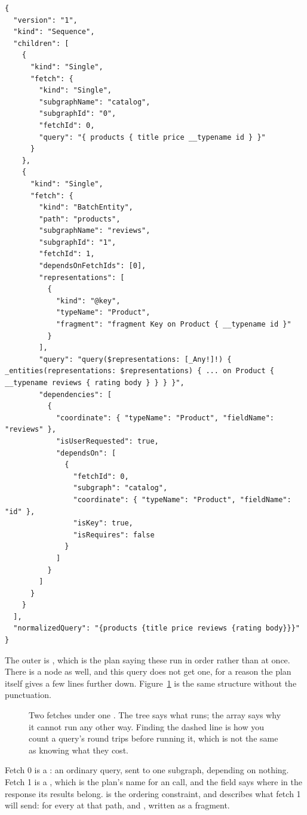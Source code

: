 \begin{verbatim}
{
  "version": "1",
  "kind": "Sequence",
  "children": [
    {
      "kind": "Single",
      "fetch": {
        "kind": "Single",
        "subgraphName": "catalog",
        "subgraphId": "0",
        "fetchId": 0,
        "query": "{ products { title price __typename id } }"
      }
    },
    {
      "kind": "Single",
      "fetch": {
        "kind": "BatchEntity",
        "path": "products",
        "subgraphName": "reviews",
        "subgraphId": "1",
        "fetchId": 1,
        "dependsOnFetchIds": [0],
        "representations": [
          {
            "kind": "@key",
            "typeName": "Product",
            "fragment": "fragment Key on Product { __typename id }"
          }
        ],
        "query": "query($representations: [_Any!]!) { _entities(representations: $representations) { ... on Product { __typename reviews { rating body } } } }",
        "dependencies": [
          {
            "coordinate": { "typeName": "Product", "fieldName": "reviews" },
            "isUserRequested": true,
            "dependsOn": [
              {
                "fetchId": 0,
                "subgraph": "catalog",
                "coordinate": { "typeName": "Product", "fieldName": "id" },
                "isKey": true,
                "isRequires": false
              }
            ]
          }
        ]
      }
    }
  ],
  "normalizedQuery": "{products {title price reviews {rating body}}}"
}
\end{verbatim}

%
The outer  is , which is the plan saying these run in
order rather than at once. There is a  node as well, and this
query does not get one, for a reason the plan itself gives a few lines further
down. Figure~\ref{fig:ch07-query-plan} is the same structure without the
punctuation.

\begin{figure}[htbp]
  \centering
  
  \caption{Two fetches under one . The tree says what runs; the
   array says why it cannot run any other way. Finding the
  dashed line is how you count a query's round trips before running it, which
  is not the same as knowing what they cost.}
  \label{fig:ch07-query-plan}
\end{figure}

%
Fetch 0 is a : an ordinary query, sent to one subgraph, depending
on nothing. Fetch 1 is a , which is the plan's name for an
 call, and the  field says where in the response its
results belong.  is the ordering constraint, and
 describes what fetch 1 will send: for every
 at that path,  and , written as a
fragment.

